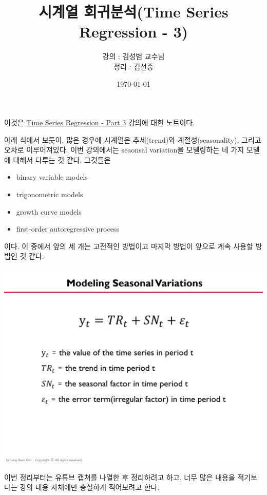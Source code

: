 \documentclass{article}
\begin{document}
\title{시계열 회귀분석(Time Series Regression - 3)}
\author{강의 : 김성범 교수님\\ 정리 :  김선중}
\date{\today}
\maketitle

이것은 \href{https://youtu.be/5QnR4L3KGz4}{Time Series Regression - Part 3} 강의에 대한 노트이다.
\tableofcontents

\bigskip\bigskip
아래 식에서 보듯이, 많은 경우에 시계열은 추세(trend)와 계절성(seasonality), 그리고 오차로 이루어져있다.
이번 강의에서는 seaonsal variation을 모델링하는 네 가지 모델에 대해서 다루는 것 같다.
그것들은
\begin{itemize}[itemsep=0pt,parsep=0pt]
\item
binary variable models
\item
trigonometric models
\item
growth curve models
\item
first-order autoregressive process
\end{itemize}
이다.
이 중에서 앞의 세 개는 고전적인 방법이고 마지막 방법이 앞으로 계속 사용할 방법인 것 같다.

\begin{center}
\includegraphics[width=.5\textwidth]{model_0}
\end{center}

이번 정리부터는 유튜브 캡쳐를 나열한 후 정리하려고 하고, 너무 많은 내용을 적기보다는 강의 내용 자체에만 충실하게 적어보려고 한다.

\end{document}
